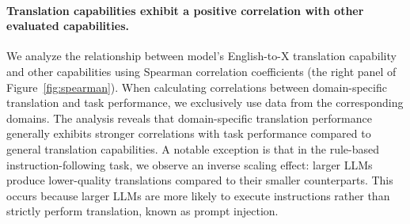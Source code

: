 \paragraph{Translation capabilities exhibit a positive correlation with other evaluated capabilities.}
We analyze the relationship between model's English-to-X translation capability and other capabilities using Spearman correlation coefficients (the right panel of Figure~\ref{fig:spearman}).
When calculating correlations between domain-specific translation and task performance, we exclusively use data from the corresponding domains.
The analysis reveals that domain-specific translation performance generally exhibits stronger correlations with task performance compared to general translation capabilities.
A notable exception is that in the rule-based instruction-following task, we observe an inverse scaling effect: larger LLMs produce lower-quality translations compared to their smaller counterparts.
This occurs because larger LLMs are more likely to execute instructions rather than strictly perform translation, known as prompt injection.





